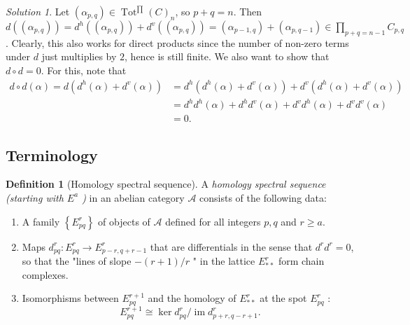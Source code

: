 \documentclass[reqno]{amsart}
\theoremstyle{definition}
\newtheorem{definition}[theorem]{Definition}
\theoremstyle{remark}
\newtheorem*{solution}{Solution}
\DeclareMathOperator{\im}{im}
\DeclareMathOperator{\Tot}{Tot}
\begin{document}
\begin{solution}
    Let
    $\left( \alpha_{p,q} \right) 
    \in \Tot^{\prod}(C)_n$, so
    $p+q = n$. Then
    $d \left( \left( \alpha_{p,q} \right)  \right) 
    = d^{h} \left( \left( \alpha_{p,q} \right)  \right) 
    + d^{v} \left( \left( \alpha_{p,q} \right)  \right) 
    = \left( \alpha_{p-1,q} \right) 
    + \left( \alpha_{p,q-1} \right) \in 
    \prod_{p+q=n-1} C_{p,q}$.
    Clearly, this also works for
    direct products since the number of non-zero terms 
    under $d$ just multiplies by $2$, hence is still finite.
    We also want to show that
    $d \circ d = 0$. For this, note that
    \begin{align*}
        d \circ d \left( \alpha \right) =
    d \left( d^{h} (\alpha) + d^{v}(\alpha) \right) 
    &= d^{h} \left( d^{h}(\alpha) + 
    d^{v} (\alpha) \right) +
    d^{v} \left( d^{h}(\alpha) + d^{v}(\alpha) \right)\\
    &= d^{h}d^{h} (\alpha) + d^{h} d^{v}(\alpha)
+ d^{v} d^{h}(\alpha) + d^{v} d^{v} (\alpha) \\
    &= 0.
    \end{align*}
\end{solution}



\subsection{Terminology}

\begin{definition}[Homology spectral sequence]
    A \textit{homology spectral sequence (starting
    with $E^{a}$ )} in an abelian category
    $\mathcal{A}$ consists of the following data:
    \begin{enumerate}
        \item A family $\left\{ E_{pq}^{r} \right\} $ of
            objects of $\mathcal{A}$ defined for
            all integers $p,q$ and $r \ge a$.
        \item Maps $d_{pq}^{r} \colon
            E_{pq}^{r} \to E_{p-r,q+r-1}^{r}$ that
            are differentials in the sense that
            $d^{r} d^{r} = 0$, so that the "lines
            of slope $-(r+1) / r$ " in the lattice
            $E_{* *}^{r}$ form chain complexes.
        \item Isomorphisms between $E_{pq}^{r+1}$ and the
            homology of $E_{* *}^{r}$ at the spot
            $E_{pq}^{r}$ :
            \[
            E_{pq}^{r+1} \cong \ker d_{pq}^{r} /
            \im d_{p+r, q-r+1}^{r}.
            \] 
    \end{enumerate}
\end{definition}
\end{document}
